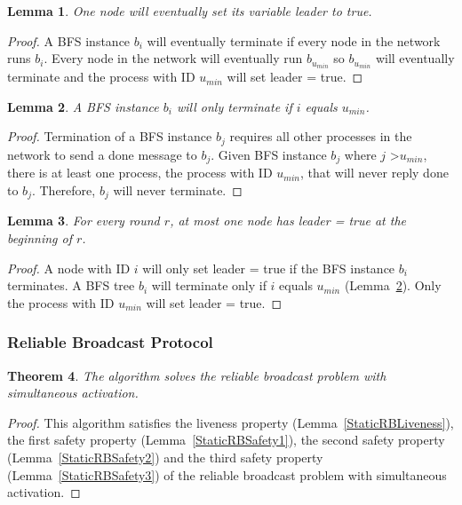 \documentclass[english]{article}
\newtheorem{theorem}{Theorem}[section]
\newtheorem{lemma}[theorem]{Lemma}
\begin{document}
\begin{lemma}
\label{LELivenessStatic}
  One node will eventually set its variable leader to true.
\end{lemma}
\begin{proof}
A BFS instance $b_i$ will eventually terminate if every node in the network runs $b_i$. 
Every node in the network will eventually run $b_{u_{min}}$ so $b_{u_{min}}$ will eventually terminate and the process with ID $u_{min}$ will set leader = true.
\end{proof}

\begin{lemma}
\label{BFSTermination}
  A BFS instance $b_i$ will only terminate if $i$ equals $u_{min}$.
\end{lemma}
\begin{proof}
Termination of a BFS instance $b_j$ requires all other processes in the network to send a done message to $b_j$.
Given BFS instance $b_j$ where $j$ \textgreater $u_{min}$, there is at least one process, the process with ID $u_{min}$, that will never reply done to $b_j$.
Therefore, $b_j$ will never terminate.
\end{proof}


\begin{lemma}
\label{LESafetyStatic}
For every round $r$, at most one node has leader = true at the beginning of $r$.
\end{lemma}
\begin{proof}
A node with ID $i$ will only set leader = true if the BFS instance $b_i$ terminates.
A BFS tree $b_i$ will terminate only if $i$ equals $u_{min}$ (Lemma~\ref{BFSTermination}).
Only the process with ID $u_{min}$ will set leader = true. 
\end{proof}

\subsubsection {Reliable Broadcast Protocol}

\begin{theorem}
\label{StaticReliableBroadcast}
The algorithm solves the reliable broadcast problem with simultaneous activation.
\end{theorem}
\begin{proof}
This algorithm satisfies the liveness property (Lemma~\ref{StaticRBLiveness}), 
the first safety property (Lemma~\ref{StaticRBSafety1}),
the second safety property (Lemma~\ref{StaticRBSafety2}) and 
the third safety property (Lemma~\ref{StaticRBSafety3}) of the reliable broadcast problem with simultaneous activation.
\end{proof}
\end{document}
